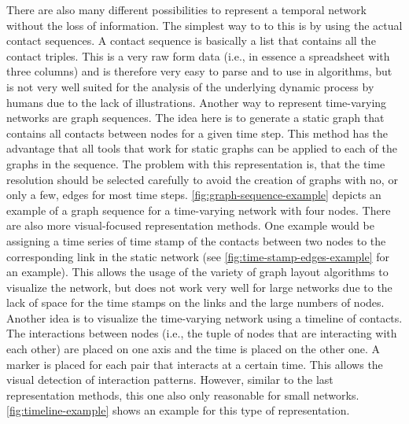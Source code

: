 There are also many different possibilities to represent a temporal network without the loss of information.
The simplest way to to this is by using the actual contact sequences.
A contact sequence is basically a list that contains all the contact triples.
This is a very raw form data (i.e., in essence a spreadsheet with three columns) and is therefore very easy to parse and to use in algorithms, but is not very well suited for the analysis of the underlying dynamic process by humans due to the lack of illustrations.
Another way to represent time-varying networks are graph sequences.
The idea here is to generate a static graph that contains all contacts between nodes for a given time step.
This method has the advantage that all tools that work for static graphs can be applied to each of the graphs in the sequence.
The problem with this representation is, that the time resolution should be selected carefully to avoid the creation of graphs with no, or only a few, edges for most time steps.
\autoref{fig:graph-sequence-example} depicts an example of a graph sequence for a time-varying network with four nodes.
There are also more visual-focused representation methods.
One example would be assigning a time series of time stamp of the contacts between two nodes to the corresponding link in the static network (see \autoref{fig:time-stamp-edges-example} for an example).
This allows the usage of the variety of graph layout algorithms to visualize the network, but does not work very well for large networks due to the lack of space for the time stamps on the links and the large numbers of nodes.
Another idea is to visualize the time-varying network using a timeline of contacts.
The interactions between nodes (i.e., the tuple of nodes that are interacting with each other) are placed on one axis and the time is placed on the other one.
A marker is placed for each pair that interacts at a certain time.
This allows the visual detection of interaction patterns.
However, similar to the last representation methods, this one also only reasonable for small networks.
\autoref{fig:timeline-example} shows an example for this type of representation.

